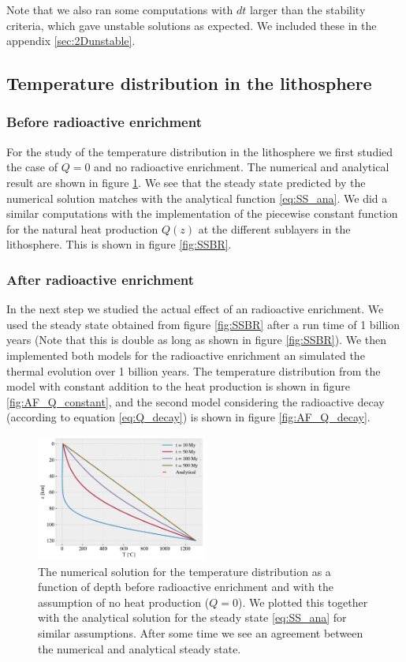 \documentclass[%
 reprint,
nofootinbib,
aps,
]{revtex4-1}
\begin{document}
 Note that we also ran some computations with $dt$ larger than the stability criteria, which gave unstable solutions as expected. We included these in the appendix \ref{sec:2Dunstable}.

\subsection{Temperature distribution in the lithosphere}
\subsubsection{Before radioactive enrichment}
For the study of the temperature distribution in the lithosphere we first studied the case of $Q = 0$ and no radioactive enrichment. The numerical and analytical result are shown in figure \ref{fig:SSBRQ0}. We see that the steady state predicted by the numerical solution matches with the analytical function \ref{eq:SS_ana}. We did a similar computations with the implementation of the piecewise constant function for the natural heat production $Q(z)$ at the different sublayers in the lithosphere. This is shown in figure \ref{fig:SSBR}.

\subsubsection{After radioactive enrichment}
In the next step we studied the actual effect of an radioactive enrichment. We used the steady state obtained from figure \ref{fig:SSBR} after a run time of 1 billion years (Note that this is double as long as shown in figure \ref{fig:SSBR}). We then implemented both models for the radioactive enrichment an simulated the thermal evolution over 1 billion years. The temperature distribution from the model with constant addition to the heat production is shown in figure \ref{fig:AF_Q_constant}, and the second model considering the radioactive decay (according to equation \ref{eq:Q_decay}) is shown in figure \ref{fig:AF_Q_decay}.


\begin{figure}[H]
    \centering
    \includegraphics[width=0.5\textwidth]{figures/SteadyState_BRQ0.pdf}
    \caption{The numerical solution for the temperature distribution as a function of depth before radioactive enrichment and with the assumption of no heat production ($Q = 0$). We plotted this together with the analytical solution for the steady state \ref{eq:SS_ana} for similar assumptions. After some time we see an agreement between the numerical and analytical steady state.}
    \label{fig:SSBRQ0}
\end{figure}
\end{document}

